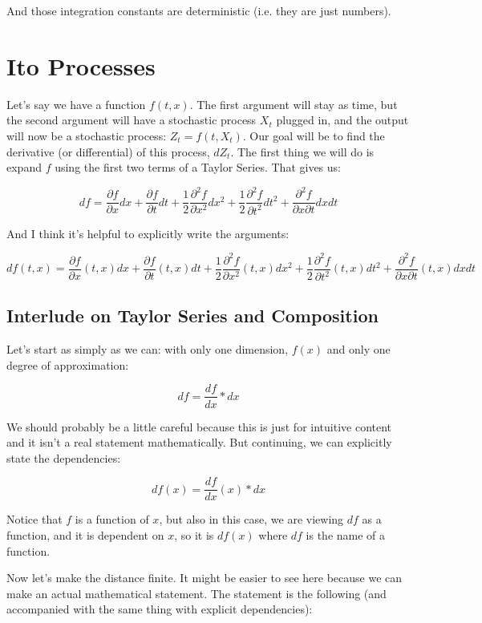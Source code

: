 \documentclass{article}
\begin{document}
And those integration constants are deterministic (i.e. they are just numbers).

\section{Ito Processes}

Let's say we have a function $f(t,x)$.  The first argument will stay as time, but the second argument will have a stochastic process $X_t$ plugged in, and the output will now be a stochastic process: $Z_t = f(t,X_t)$.  Our goal will be to find the derivative (or differential) of this process, $dZ_t$. The first thing we will do is expand $f$ using the first two terms of a Taylor Series. That gives us:

$$df = \frac{\partial f}{\partial x} dx + \frac{\partial f}{\partial t} dt + \frac{1}{2}\frac{\partial^2 f}{\partial x^2} dx^2 + \frac{1}{2}\frac{\partial^2 f}{\partial t^2} dt^2 + \frac{\partial^2 f}{\partial x \partial t} dx dt$$

And I think it's helpful to explicitly write the arguments:

$$df(t,x) = \frac{\partial f}{\partial x}(t,x) dx + \frac{\partial f}{\partial t}(t,x) dt + \frac{1}{2}\frac{\partial^2 f}{\partial x^2}(t,x) dx^2 + \frac{1}{2}\frac{\partial^2 f}{\partial t^2}(t,x) dt^2 + \frac{\partial^2 f}{\partial x \partial t}(t,x) dx dt$$

\subsection{Interlude on Taylor Series and Composition}

Let's start as simply as we can: with only one dimension, $f(x)$ and only one degree of approximation:

$$df = \frac{df}{dx} * dx$$

We should probably be a little careful because this is just for intuitive content and it isn't a real statement mathematically.  But continuing, we can explicitly state the dependencies:

$$df(x) = \frac{df}{dx}(x) * dx$$

Notice that $f$ is a function of $x$, but also in this case, we are viewing $df$ as a function, and it is dependent on $x$, so it is $df(x)$ where $df$ is the name of a function.

Now let's make the distance finite. It might be easier to see here because we can make an actual mathematical statement.  The statement is the following (and accompanied with the same thing with explicit dependencies):
\end{document}
